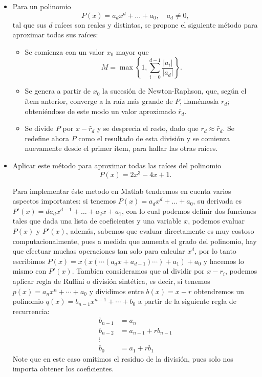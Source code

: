 \begin{itemize}
\begin{proof}
    \end{proof}
    \item Para un polinomio
    \[
    P(x) = a_d x^d + \dots + a_0, \quad a_d \neq 0,
    \]
    tal que sus $d$ raíces son reales y distintas, se propone el siguiente método para aproximar todas sus raíces:
    \begin{itemize}
        \item Se comienza con un valor $x_0$ mayor que
        \[
        M = \max \left\{ 1, \sum_{i=0}^{d-1} \frac{|a_i|}{|a_d|} \right\}.
        \]
        \item Se genera a partir de $x_0$ la sucesión de Newton-Raphson, que, según el ítem anterior, converge a la raíz más grande de $P$, llamémosla $r_d$; obteniéndose de este modo un valor aproximado $\tilde{r_d}$.
        \item Se divide $P$ por $x - \tilde{r_d}$ y se desprecia el resto, dado que $r_d \approx \tilde{r_d}$. Se redefine ahora $P$ como el resultado de esta división y se comienza nuevamente desde el primer ítem, para hallar las otras raíces.
    \end{itemize}
    \item Aplicar este método para aproximar todas las raíces del polinomio
    \[
    P(x) = 2x^3 - 4x + 1.
    \]

    \begin{solution}
        Para implementar éste metodo en Matlab tendremos en cuenta varios aspectos importantes: si tenemos $P(x)= a_dx^d + \ldots + a_0$, su derivada es $P'(x)=da_dx^{d-1}+\ldots+a_2x+a_1$, con lo cual podemos definir dos funciones tales que dada una lista de coeficientes y una variable $x$, podemos evaluar $P(x)$ y $P'(x)$, además, sabemos que evaluar directamente es muy costoso computacionalmente, pues a medida que aumenta el grado del polinomio, hay que efectuar muchas operaciones tan solo para calcular $x^d$, por lo tanto escribimos $P(x)=x(x(\cdots(a_dx+a_{d-1})\cdots)+a_1)+a_0$ y hacemos lo mismo con $P'(x)$. Tambien consideramos que al dividir por $x-r_i$, podemos aplicar regla de Ruffini o división sintética, es decir, si tenemos $p(x)=a_nx^n + \cdots + a_0$ y dividimos entre $b(x)=x-r$ obtendremos un polinomio $q(x) = b_{n-1}x^{n-1} + \cdots + b_0 $ a partir de la siguiente regla de recurrencia:
        \begin{align*}
            b_{n-1} &= a_{n}\\
            b_{n-2} &= a_{n-1}+rb_{n-1}\\ 
            \vdots \\   
            b_{0} &= a_1 + rb_1
        \end{align*}
        Note que en este caso omitimos el residuo de la división, pues solo nos importa obtener los coeficientes. 


\end{solution}
\end{itemize}
